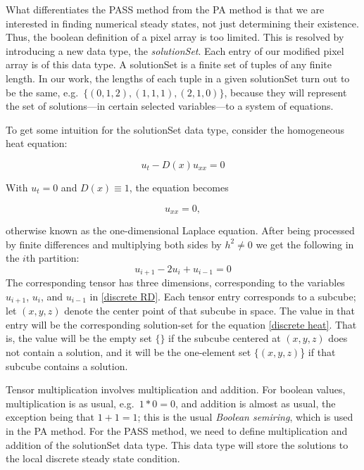 \documentclass[11pt]{article}
\begin{document}
What differentiates the PASS method from the PA method is that we are interested in finding numerical steady states, not just determining their existence. Thus, the boolean definition of a pixel array is too limited. This is resolved by introducing a new data type, the \textit{solutionSet}. Each entry of our modified pixel array is of this data type. A solutionSet is a finite set of tuples of any finite length. In our work, the lengths of each tuple in a given solutionSet turn out to be the same, e.g.\  $\{(0,1,2), (1,1,1), (2,1,0)\}$, because they will represent the set of solutions---in certain selected variables---to a system of equations.

To get some intuition for the solutionSet data type, consider the homogeneous heat equation:

\begin{equation}
    \label{general homogeneous heat}
    u_t - D(x)u_{xx} = 0
\end{equation}

\noindent With $u_t = 0$ and $D(x) \equiv 1$, the equation becomes

\begin{equation}
    \label{homogeneous heat}
    u_{xx} = 0,
\end{equation}

\noindent otherwise known as the one-dimensional Laplace equation. After being processed by finite differences and multiplying both sides by $h^2 \ne 0$ we get the following in the $i$th partition: 
\begin{equation}
    \label{discrete heat}
    u_{i+1} - 2u_i + u_{i-1} = 0
\end{equation}
The corresponding tensor has three dimensions, corresponding to the variables $u_{i+1}$, $u_i$, and $u_{i-1}$ in \cref{discrete RD}. Each tensor entry corresponds to a subcube; let $(x,y,z)$ denote the center point of that subcube in space. The value in that entry will be the corresponding solution-set for the equation \cref{discrete heat}. That is, the value will be the empty set $\{\}$ if the subcube centered at $(x,y,z)$ does not contain a solution, and it will be the one-element set $\{(x,y,z)$\} if that subcube contains a solution.

Tensor multiplication involves multiplication and addition. For boolean values, multiplication is as usual, e.g.\ $1*0=0$, and addition is almost as usual, the exception being that $1+1=1$; this is the usual \emph{Boolean semiring}, which is used in the PA method. For the PASS method, we need to define multiplication and addition of the solutionSet data type. This data type will store the solutions to the local discrete steady state condition.
\end{document}
